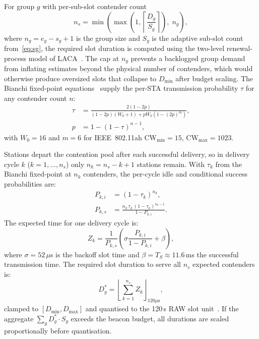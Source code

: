 \documentclass[conference]{IEEEtran}
\begin{document}
For group $g$ with per-sub-slot contender count
\begin{equation}
  n_s = \min\!\left(\max\!\left(1,\left\lceil\frac{D_g}{S_g}\right\rceil\right),\; n_g\right),
  \label{eq:ns}
\end{equation}
where $n_g\!=\!e_g\!-\!s_g\!+\!1$ is the group size and $S_g$ is the
adaptive sub-slot count from~\eqref{eq:sg}, the required slot duration
is computed using the two-level renewal-process model of
LACA~\cite{taramit2023}.
The cap at $n_g$ prevents a backlogged group demand from inflating
estimates beyond the physical number of contenders, which would otherwise
produce oversized slots that collapse to $D_\mathrm{min}$ after budget scaling.
The Bianchi fixed-point equations~\cite{bianchi2000} supply the
per-STA transmission probability $\tau$ for any contender count $n$:
\begin{align}
  \tau &= \frac{2(1-2p)}{(1-2p)(W_0+1)+pW_0(1-(2p)^m)}, \\
  p    &= 1-(1-\tau)^{n-1},
\end{align}
with $W_0\!=\!16$ and $m\!=\!6$ for IEEE~802.11ah CW$_\mathrm{min}\!=\!15$,
CW$_\mathrm{max}\!=\!1023$.

Stations depart the contention pool after each successful delivery,
so in delivery cycle $k$ ($k\!=\!1,\ldots,n_s$) only
$n_k\!=\!n_s\!-\!k\!+\!1$ stations remain.
With $\tau_k$ from the Bianchi fixed-point at $n_k$ contenders,
the per-cycle idle and conditional success probabilities are:
\begin{align}
  P_{k,i} &= (1-\tau_k)^{n_k}, \\
  P_{k,s} &= \frac{n_k\,\tau_k\,(1-\tau_k)^{n_k-1}}{1-P_{k,i}}.
\end{align}
The expected time for one delivery cycle is:
\begin{equation}
  Z_k = \frac{1}{P_{k,s}}\!\left(\sigma\frac{P_{k,i}}{1-P_{k,i}} + \beta\right),
  \label{eq:zk}
\end{equation}
where $\sigma\!=\!52\,\mu$s is the backoff slot time and
$\beta\!=\!T_S\!\approx\!11.6$\,ms the successful transmission time.
The required slot duration to serve all $n_s$ expected contenders is:
\begin{equation}
  D_g^* = \left\lfloor\sum_{k=1}^{n_s} Z_k\right\rfloor_{\!120\mu\text{s}},
  \label{eq:slot_size}
\end{equation}
clamped to $[D_\mathrm{min}, D_\mathrm{max}]$ and quantised to the
120\,\textmu{}s RAW slot unit~\cite{std80211ah}.
If the aggregate $\sum_g D_g^*\!\cdot\!S_g$ exceeds the beacon budget,
all durations are scaled proportionally before quantisation.
\end{document}
